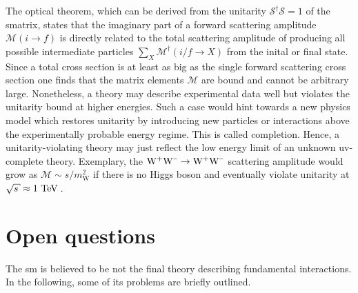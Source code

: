 The optical theorem, which can be derived from the unitarity $\mathcal{S}^{\dagger}\mathcal{S}=1$ of the \gls{smatrix}, states that the imaginary part of a forward scattering amplitude $\mathcal{M}(i\to f)$ is directly related to the total scattering amplitude of producing all possible intermediate particles $\sum_{X}\mathcal{M}^\dagger(i/f\to X)$ from the inital or final state. Since a total cross section is at least as big as the single forward scattering cross section one finds that the matrix elements $\mathcal{M}$ are bound and cannot be arbitrary large. Nonetheless, a theory may describe experimental data well but violates the unitarity bound at higher energies. Such a case would hint towards a new physics model which restores unitarity by introducing new particles or interactions above the experimentally probable energy regime. This is called  completion. Hence, a unitarity-violating theory may just reflect the low energy limit of an unknown \gls{uv}-complete theory. Exemplary, the $\mathrm{W}^{\rmplus}\mathrm{W}^{\rmminus}\to\mathrm{W}^{\rmplus}\mathrm{W}^{\rmminus}$ scattering amplitude would grow as $\mathcal{M}\sim s/m_\mathrm{W}^2$ if there is no Higgs boson and eventually violate unitarity at $\sqrt{s}\approx1~\TeV$\,.


\section{Open questions}

The \gls{sm} is believed to be not the final theory describing fundamental interactions. In the following, some of its problems are briefly outlined.

